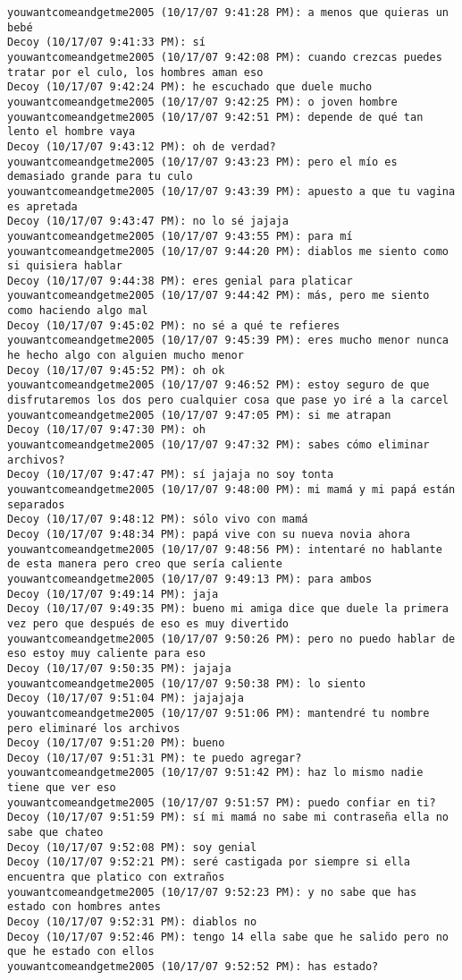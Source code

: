 \begin{verbatim}
youwantcomeandgetme2005 (10/17/07 9:41:28 PM): a menos que quieras un bebé
Decoy (10/17/07 9:41:33 PM): sí
youwantcomeandgetme2005 (10/17/07 9:42:08 PM): cuando crezcas puedes tratar por el culo, los hombres aman eso
Decoy (10/17/07 9:42:24 PM): he escuchado que duele mucho
youwantcomeandgetme2005 (10/17/07 9:42:25 PM): o joven hombre
youwantcomeandgetme2005 (10/17/07 9:42:51 PM): depende de qué tan lento el hombre vaya
Decoy (10/17/07 9:43:12 PM): oh de verdad?
youwantcomeandgetme2005 (10/17/07 9:43:23 PM): pero el mío es demasiado grande para tu culo
youwantcomeandgetme2005 (10/17/07 9:43:39 PM): apuesto a que tu vagina es apretada
Decoy (10/17/07 9:43:47 PM): no lo sé jajaja
youwantcomeandgetme2005 (10/17/07 9:43:55 PM): para mí
youwantcomeandgetme2005 (10/17/07 9:44:20 PM): diablos me siento como si quisiera hablar
Decoy (10/17/07 9:44:38 PM): eres genial para platicar
youwantcomeandgetme2005 (10/17/07 9:44:42 PM): más, pero me siento como haciendo algo mal
Decoy (10/17/07 9:45:02 PM): no sé a qué te refieres
youwantcomeandgetme2005 (10/17/07 9:45:39 PM): eres mucho menor nunca he hecho algo con alguien mucho menor
Decoy (10/17/07 9:45:52 PM): oh ok
youwantcomeandgetme2005 (10/17/07 9:46:52 PM): estoy seguro de que disfrutaremos los dos pero cualquier cosa que pase yo iré a la carcel
youwantcomeandgetme2005 (10/17/07 9:47:05 PM): si me atrapan
Decoy (10/17/07 9:47:30 PM): oh
youwantcomeandgetme2005 (10/17/07 9:47:32 PM): sabes cómo eliminar archivos?
Decoy (10/17/07 9:47:47 PM): sí jajaja no soy tonta
youwantcomeandgetme2005 (10/17/07 9:48:00 PM): mi mamá y mi papá están separados
Decoy (10/17/07 9:48:12 PM): sólo vivo con mamá
Decoy (10/17/07 9:48:34 PM): papá vive con su nueva novia ahora
youwantcomeandgetme2005 (10/17/07 9:48:56 PM): intentaré no hablante de esta manera pero creo que sería caliente
youwantcomeandgetme2005 (10/17/07 9:49:13 PM): para ambos
Decoy (10/17/07 9:49:14 PM): jaja
Decoy (10/17/07 9:49:35 PM): bueno mi amiga dice que duele la primera vez pero que después de eso es muy divertido
youwantcomeandgetme2005 (10/17/07 9:50:26 PM): pero no puedo hablar de eso estoy muy caliente para eso
Decoy (10/17/07 9:50:35 PM): jajaja
youwantcomeandgetme2005 (10/17/07 9:50:38 PM): lo siento
Decoy (10/17/07 9:51:04 PM): jajajaja
youwantcomeandgetme2005 (10/17/07 9:51:06 PM): mantendré tu nombre pero eliminaré los archivos
Decoy (10/17/07 9:51:20 PM): bueno
Decoy (10/17/07 9:51:31 PM): te puedo agregar?
youwantcomeandgetme2005 (10/17/07 9:51:42 PM): haz lo mismo nadie tiene que ver eso
youwantcomeandgetme2005 (10/17/07 9:51:57 PM): puedo confiar en ti?
Decoy (10/17/07 9:51:59 PM): sí mi mamá no sabe mi contraseña ella no sabe que chateo
Decoy (10/17/07 9:52:08 PM): soy genial
Decoy (10/17/07 9:52:21 PM): seré castigada por siempre si ella encuentra que platico con extraños
youwantcomeandgetme2005 (10/17/07 9:52:23 PM): y no sabe que has estado con hombres antes
Decoy (10/17/07 9:52:31 PM): diablos no
Decoy (10/17/07 9:52:46 PM): tengo 14 ella sabe que he salido pero no que he estado con ellos
youwantcomeandgetme2005 (10/17/07 9:52:52 PM): has estado?
\end{verbatim}